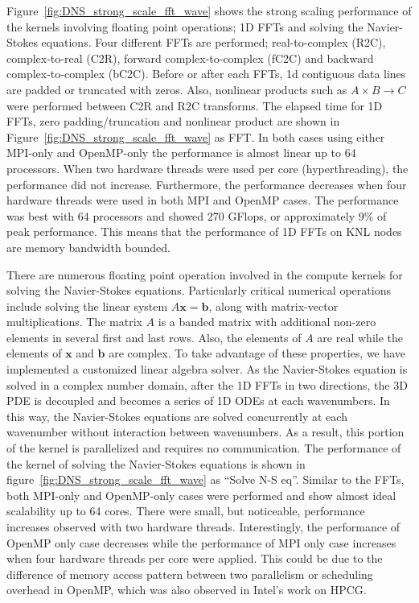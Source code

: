 Figure~\ref{fig:DNS_strong_scale_fft_wave} shows the strong scaling
performance of the kernels involving floating point operations; 1D FFTs
and solving the Navier-Stokes equations. Four different FFTs are performed;
real-to-complex (R2C), complex-to-real (C2R), forward complex-to-complex
(fC2C) and backward complex-to-complex (bC2C). Before or after each FFTs, 
1d contiguous data lines are padded or truncated with zeros. 
Also, nonlinear products such as $A\times B \rightarrow C$
were performed between C2R and R2C transforms. The elapsed time for 1D
FFTs, zero padding/truncation and nonlinear product are shown in
Figure~\ref{fig:DNS_strong_scale_fft_wave} as FFT. In both cases using
either MPI-only and OpenMP-only the performance is almost linear up to 64
processors. When two hardware threads were used per core (hyperthreading), the
performance did not increase. Furthermore, the performance decreases when four
hardware threads were used in both MPI and OpenMP cases. The performance
was best with 64 processors and showed 270 GFlops, or
approximately 9\% of peak performance. This means that the performance of
1D FFTs on KNL nodes are memory bandwidth bounded. 

There are numerous floating point operation involved in the compute 
kernels for solving the Navier-Stokes equations. 
Particularly critical numerical operations include solving the linear system  
$A \textbf{x} = \textbf{b}$, along with 
matrix-vector multiplications. The matrix $A$ is a banded matrix with
additional non-zero elements in several first and last rows. Also, the
elements of $A$ are real while the elements of $\textbf{x}$ and
$\textbf{b}$ are complex. To take advantage of these properties, we have
implemented a customized linear algebra solver. As the Navier-Stokes
equation is solved in a complex number domain, after the 1D FFTs in two
directions, the 3D PDE is decoupled and becomes a series of 1D ODEs 
at each wavenumbers. In this way, the 
Navier-Stokes equations are solved concurrently at each wavenumber without
interaction between wavenumbers. As a result, this portion of the kernel
is parallelized and requires no communication. The performance of
the kernel of solving the Navier-Stokes equations is shown in
figure~\ref{fig:DNS_strong_scale_fft_wave} as ``Solve N-S eq''. Similar to
the FFTs, both MPI-only and OpenMP-only cases were performed and show 
almost ideal scalability up to 64 cores. 
There were small, but noticeable, performance increases
observed with two hardware threads. Interestingly, the performance of
OpenMP only case decreases while the performance of MPI only case
increases when four hardware threads per core were applied. This could be
due to the difference of memory access pattern between two parallelism
or scheduling overhead in OpenMP, which was also observed in Intel's work on
HPCG\cite{Park:2014:ESI:2683593.2683696}. 
%
%

